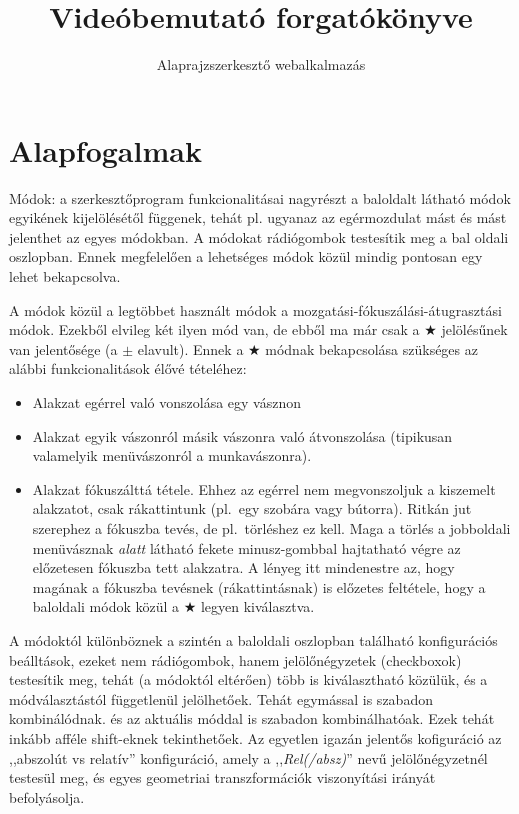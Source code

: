 \documentclass{article}
\title{Videóbemutató forgatókönyve}
\author{Alaprajzszerkesztő webalkalmazás}
\begin{document}
{
	\maketitle

	\setcounter{tocdepth}{4}
	\tableofcontents

	\section{Alapfogalmak}
	Módok: a szerkesztőprogram funkcionalitásai nagyrészt a baloldalt látható módok egyikének kijelölésétől függenek, tehát pl. ugyanaz az egérmozdulat mást és mást jelenthet az egyes módokban. A módokat rádiógombok testesítik meg a bal oldali oszlopban. Ennek megfelelően a lehetséges módok közül mindig pontosan egy lehet bekapcsolva.

	A módok közül a legtöbbet használt módok a mozgatási-fókuszálási-átugrasztási módok. Ezekből elvileg két ilyen mód van, de ebből ma már csak a $\bigstar$ jelölésűnek van jelentősége (a $\pm$ elavult). Ennek a $\bigstar$ módnak bekapcsolása szükséges az alábbi funkcionalitások élővé tételéhez:
	\begin{itemize}
		\item Alakzat egérrel való vonszolása egy vásznon
		\item Alakzat egyik vászonról másik vászonra való átvonszolása (tipikusan valamelyik menüvászonról a munkavászonra).
		\item Alakzat fókuszálttá tétele. Ehhez az egérrel nem megvonszoljuk a kiszemelt alakzatot, csak rákattintunk (pl.~egy szobára vagy bútorra). Ritkán jut szerephez a fókuszba tevés, de pl.~törléshez ez kell. Maga a törlés a jobboldali menüvásznak \emph{alatt} látható fekete minusz-gombbal hajtatható végre az előzetesen fókuszba tett alakzatra. A lényeg itt mindenestre az, hogy magának a fókuszba tevésnek (rákattintásnak) is előzetes feltétele, hogy a baloldali módok közül a $\bigstar$ legyen kiválasztva.
	\end{itemize}

	A módoktól különböznek a szintén a baloldali oszlopban található konfigurációs beálltások, ezeket nem rádiógombok, hanem jelölőnégyzetek (checkboxok) testesítik meg, tehát (a módoktól eltérően) több is kiválasztható közülük, és a módválasztástól függetlenül jelölhetőek. Tehát egymással is szabadon kombinálódnak. és az aktuális móddal is szabadon kombinálhatóak. Ezek tehát inkább afféle shift-eknek tekinthetőek. Az egyetlen igazán jelentős kofiguráció az ,,abszolút vs relatív'' konfiguráció, amely a ,,\emph{Rel(/absz)}'' nevű jelölőnégyzetnél testesül meg, és egyes geometriai transzformációk viszonyítási irányát befolyásolja.
}
\end{document}
